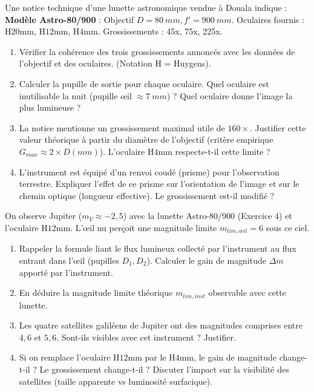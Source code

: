 \documentclass[11pt]{article}
\begin{document}
\begin{exercice}
Une notice technique d'une lunette astronomique vendue à Douala indique : \og \textbf{Modèle Astro-80/900} : Objectif $D=\SI{80}{mm}, f'=\SI{900}{mm}$. Oculaires fournis : H$20$mm, H$12$mm, H$4$mm. Grossissements : 45x, 75x, 225x. \fg
\begin{enumerate}
    \item Vérifier la cohérence des trois grossissements annoncés avec les données de l'objectif et des oculaires. (Notation H = Huygens).
    \item Calculer la pupille de sortie pour chaque oculaire. Quel oculaire est inutilisable la nuit (pupille œil $\approx \SI{7}{mm}$) ? Quel oculaire donne l'image la plus lumineuse ?
    \item La notice mentionne un \og grossissement maximal utile \fg de $160\times$. Justifier cette valeur théorique à partir du diamètre de l'objectif (critère empirique $G_{max} \approx 2 \times D(mm)$). L'oculaire H$4$mm respecte-t-il cette limite ?
    \item L'instrument est équipé d'un renvoi coudé (prisme) pour l'observation terrestre. Expliquer l'effet de ce prisme sur l'orientation de l'image et sur le chemin optique (longueur effective). Le grossissement est-il modifié ?
\end{enumerate}
\end{exercice}

\begin{exercice}
On observe Jupiter ($m_V \approx -2,5$) avec la lunette Astro-80/900 (Exercice 4) et l'oculaire H$12$mm. L'œil nu perçoit une magnitude limite $m_{lim, œil} = 6$ sous ce ciel.
\begin{enumerate}
    \item Rappeler la formule liant le flux lumineux collecté par l'instrument au flux entrant dans l'œil (pupilles $D_1, D_2$). Calculer le gain de magnitude $\Delta m$ apporté par l'instrument.
    \item En déduire la magnitude limite théorique $m_{lim, inst}$ observable avec cette lunette.
    \item Les quatre satellites galiléens de Jupiter ont des magnitudes comprises entre $4,6$ et $5,6$. Sont-ils visibles avec cet instrument ? Justifier.
    \item Si on remplace l'oculaire H$12$mm par le H$4$mm, le gain de magnitude change-t-il ? Le grossissement change-t-il ? Discuter l'impact sur la visibilité des satellites (taille apparente vs luminosité surfacique).
\end{enumerate}
\end{exercice}
\end{document}
